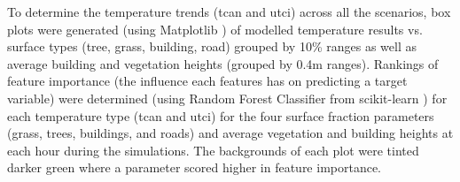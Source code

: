 \documentclass[final,3p,times,authoryear]{elsarticle}
\begin{document}
%


To determine the temperature trends (\gls{tcan} and \gls{utci}) across all the scenarios, box plots were generated (using Matplotlib \citep{Hunter2007}) of modelled temperature results vs. surface types (tree, grass, building, road) grouped by 10\% ranges as well as average building and vegetation heights (grouped by 0.4m ranges). Rankings of feature importance (the influence each features has on predicting a target variable) were determined (using Random Forest Classifier from  scikit-learn \citep{scikit-learn}) for each temperature type (\gls{tcan} and \gls{utci}) for the four surface fraction parameters (grass, trees, buildings, and roads) and average vegetation and building heights at each hour during the simulations. The backgrounds of each plot were tinted darker green where a parameter scored higher in feature importance.
\end{document}
